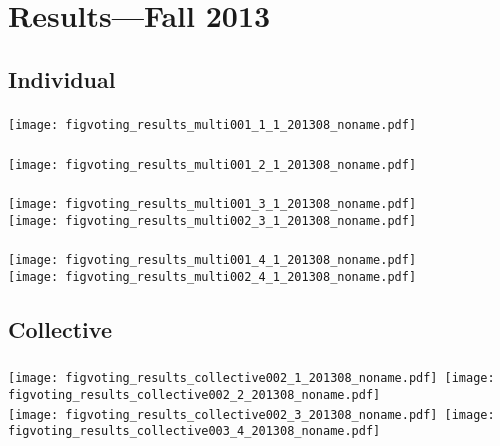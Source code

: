 \section{Results---Fall 2013}

\subsection{Individual}

\begin{frame}[plain]
  \frametitle{}

  \texttt{[image: figvoting\_results\_multi001\_1\_1\_201308\_noname.pdf]}\\

\end{frame}

\begin{frame}[plain]
  \frametitle{}

  \texttt{[image: figvoting\_results\_multi001\_2\_1\_201308\_noname.pdf]}\\

\end{frame}

\begin{frame}[plain]
  \frametitle{}

  \texttt{[image: figvoting\_results\_multi001\_3\_1\_201308\_noname.pdf]}\\
  \texttt{[image: figvoting\_results\_multi002\_3\_1\_201308\_noname.pdf]}

\end{frame}

\begin{frame}[plain]
  \frametitle{}

  \texttt{[image: figvoting\_results\_multi001\_4\_1\_201308\_noname.pdf]}\\
  \texttt{[image: figvoting\_results\_multi002\_4\_1\_201308\_noname.pdf]}

\end{frame}

\subsection{Collective}

\begin{frame}[plain]
  \frametitle{}

  \texttt{[image: figvoting\_results\_collective002\_1\_201308\_noname.pdf]}~\texttt{[image: figvoting\_results\_collective002\_2\_201308\_noname.pdf]}\\
  \texttt{[image: figvoting\_results\_collective002\_3\_201308\_noname.pdf]}~\texttt{[image: figvoting\_results\_collective003\_4\_201308\_noname.pdf]}


\end{frame}


